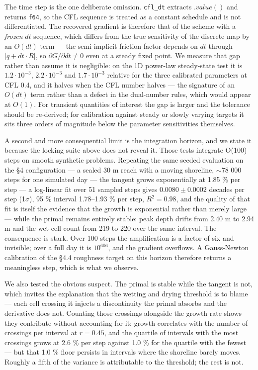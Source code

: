 The time step is the one deliberate omission. \texttt{cfl\_dt} extracts
\(.value()\) and returns \texttt{f64}, so the CFL sequence is treated as
a constant schedule and is not differentiated. The recovered gradient is
therefore that of the scheme with a \emph{frozen} \(dt\) sequence, which
differs from the true sensitivity of the discrete map by an \(O(dt)\)
term --- the semi-implicit friction factor depends on \(dt\) through
\(|q + dt\cdot R|\), so \(\partial G/\partial dt \neq 0\) even at a
steady fixed point. We measure that gap rather than assume it is
negligible: on the 1D power-law steady-state test it is
\(1.2\cdot 10^{-3}\), \(2.2\cdot 10^{-3}\) and \(1.7\cdot 10^{-3}\)
relative for the three calibrated parameters at CFL 0.4, and it halves
when the CFL number halves --- the signature of an \(O(dt)\) term rather
than a defect in the dual-number rules, which would appear at \(O(1)\).
For transient quantities of interest the gap is larger and the tolerance
should be re-derived; for calibration against steady or slowly varying
targets it sits three orders of magnitude below the parameter
sensitivities themselves.

A second and more consequential limit is the integration horizon, and we
state it because the locking suite above does not reveal it. Those tests
integrate O(100) steps on smooth synthetic problems. Repeating the same
seeded evaluation on the §4 configuration --- a sealed 30 m reach with a
moving shoreline, $\sim$78 000 steps for one simulated day ---
the tangent grows exponentially at 1.85 \% per step --- a log-linear fit
over 51 sampled steps gives \(0.0080 \pm 0.0002\) decades per step
(1\(\sigma\)), 95 \% interval 1.78--1.93 \% per step, \(R^{2} = 0.98\),
and the quality of that fit is itself the evidence that the growth is
exponential rather than merely large --- while the primal remains
entirely stable: peak depth drifts from 2.40 m to 2.94 m and the
wet-cell count from 219 to 220 over the same interval. The consequence
is stark. Over 100 steps the amplification is a factor of six and
invisible; over a full day it is \(10^{606}\), and the gradient
overflows. A Gauss-Newton calibration of the §4.4 roughness target on
this horizon therefore returns a meaningless step, which is what we
observe.

We also tested the obvious suspect. The primal is stable while the
tangent is not, which invites the explanation that the wetting and
drying threshold is to blame --- each cell crossing it injects a
discontinuity the primal absorbs and the derivative does not. Counting
those crossings alongside the growth rate shows they contribute without
accounting for it: growth correlates with the number of crossings per
interval at \(r = 0.45\), and the quartile of intervals with the most
crossings grows at 2.6 \% per step against 1.0 \% for the quartile with
the fewest --- but that 1.0 \% floor persists in intervals where the
shoreline barely moves. Roughly a fifth of the variance is attributable
to the threshold; the rest is not.

